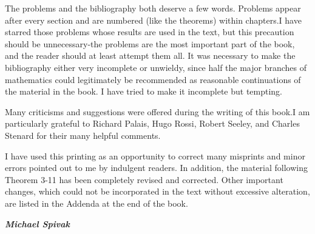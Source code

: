 The problems and the bibliography both deserve a few words. 
Problems appear after every section and are 
numbered (like the theorems) within chapters.I have starred
those problems whose results are used in the text, but this
precaution should be unnecessary-the problems are the most
important part of the book, and the reader should at least
attempt them all. It was necessary to make the bibliography
either very incomplete or unwieldy, since half the major 
branches of mathematics could legitimately be recommended
as reasonable continuations of the material in the book.
I have tried to make it incomplete but tempting.

Many criticisms and suggestions were offered during the
writing of this book.I am particularly grateful to Richard
Palais, Hugo Rossi, Robert Seeley, and Charles Stenard for
their many helpful comments.

I have used this printing as an opportunity to correct many
misprints and minor errors pointed out to me by indulgent
readers. In addition, the material following Theorem 3-11
has been completely revised and corrected. Other important
changes, which could not be incorporated in the text without
excessive alteration, are listed in the Addenda at the end of the
book.

\vspace*{1em}
\hspace*{\fill}\textbf{\itshape Michael Spivak}\par 
{}\par 
{}
\newpage